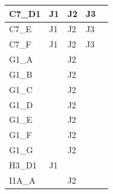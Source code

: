 \begin{longtable}{|l|l|l|l|l|}
C7\_D1                                               & J1                       & J2                     & J3                     &                                               \\ \hline
C7\_E                                                & J1                       & J2                     & J3                     &                                               \\ \hline
C7\_F                                                & J1                       & J2                     & J3                     &                                               \\ \hline
G1\_A                                                &                          & J2                     &                         &                                               \\ \hline
G1\_B                                                &                          & J2                     &                         &                                               \\ \hline
G1\_C                                                &                          & J2                     &                         &                                               \\ \hline
G1\_D                                                &                          & J2                     &                         &                                               \\ \hline
G1\_E                                                &                          & J2                     &                         &                                               \\ \hline
G1\_F                                                &                          & J2                     &                         &                                               \\ \hline
G1\_G                                                &                          & J2                     &                         &                                               \\ \hline
H3\_D1                                               & J1                       &                        &                         &                                               \\ \hline
I1A\_A                                               &                          & J2                     &                         &                                               \\ \hline

\end{longtable}

